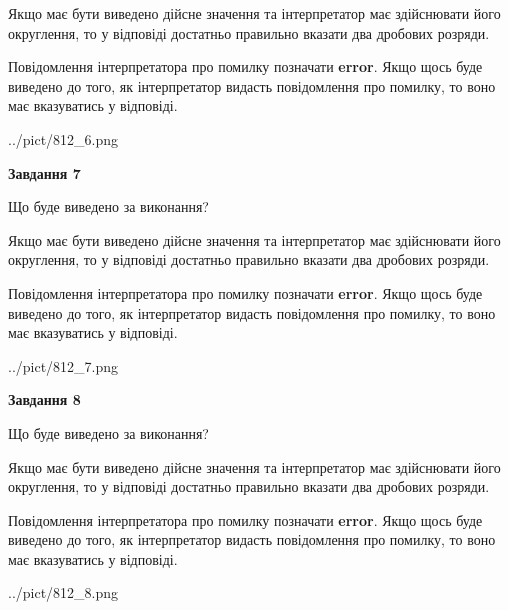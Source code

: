 \documentclass[12pt, ukrainian]{article}
\begin{document}
{\begin {Large}
Якщо має бути виведено дійсне значення та інтерпретатор має здійснювати його округлення, 
то у відповіді достатньо правильно вказати два дробових розряди.

Повідомлення інтерпретатора про помилку позначати \textbf{error}.
Якщо щось буде виведено до того, як інтерпретатор видасть повідомлення про помилку, 
то воно має вказуватись у відповіді. \par

\begin{center}
	{../pict/812_6.png}
\end{center}
\newpage

{\begin {center}\textbf{Завдання 7}\end {center}}\par
Що буде виведено за виконання? \par

Якщо має бути виведено дійсне значення та інтерпретатор має здійснювати його округлення, 
то у відповіді достатньо правильно вказати два дробових розряди.

Повідомлення інтерпретатора про помилку позначати \textbf{error}.
Якщо щось буде виведено до того, як інтерпретатор видасть повідомлення про помилку, 
то воно має вказуватись у відповіді. \par

\begin{center}
	{../pict/812_7.png}
\end{center}
\newpage

{\begin {center}\textbf{Завдання 8}\end {center}}\par
Що буде виведено за виконання? \par

Якщо має бути виведено дійсне значення та інтерпретатор має здійснювати його округлення, 
то у відповіді достатньо правильно вказати два дробових розряди.

Повідомлення інтерпретатора про помилку позначати \textbf{error}.
Якщо щось буде виведено до того, як інтерпретатор видасть повідомлення про помилку, 
то воно має вказуватись у відповіді. \par

\begin{center}
	{../pict/812_8.png}
\end{center}
\newpage


\end{Large}}
\end{document}
